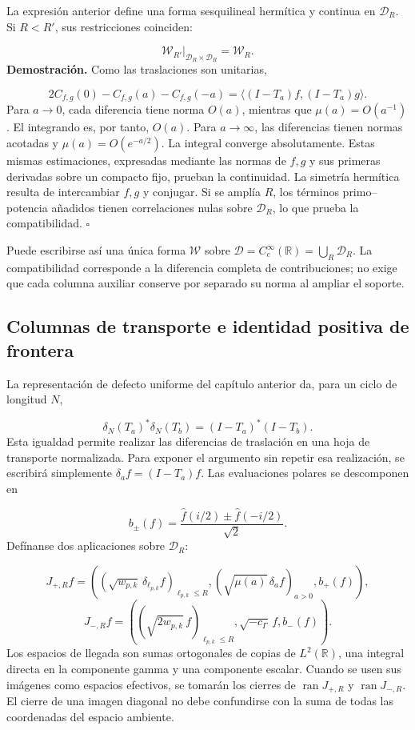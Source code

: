 La expresión anterior define una forma sesquilineal hermítica y continua en \(\mathcal D_R\). Si \(R<R'\), sus restricciones coinciden:

\[
\mathscr W_{R'}|_{\mathcal D_R\times\mathcal D_R}=\mathscr W_R.
\]
\textbf{Demostración.} Como las traslaciones son unitarias,

\[
2C_{f,g}(0)-C_{f,g}(a)-C_{f,g}(-a)
=\langle(I-T_a)f,(I-T_a)g\rangle.
\]
Para \(a\to0\), cada diferencia tiene norma \(O(a)\), mientras que \(\mu(a)=O(a^{-1})\). El integrando es, por tanto, \(O(a)\). Para \(a\to\infty\), las diferencias tienen normas acotadas y \(\mu(a)=O(e^{-a/2})\). La integral converge absolutamente. Estas mismas estimaciones, expresadas mediante las normas de \(f,g\) y sus primeras derivadas sobre un compacto fijo, prueban la continuidad. La simetría hermítica resulta de intercambiar \(f,g\) y conjugar. Si se amplía \(R\), los términos primo–potencia añadidos tienen correlaciones nulas sobre \(\mathcal D_R\), lo que prueba la compatibilidad. \hfill\(\square\)

Puede escribirse así una única forma \(\mathscr W\) sobre \(\mathcal D=C_c^\infty(\mathbb R)=\bigcup_R\mathcal D_R\). La compatibilidad corresponde a la diferencia completa de contribuciones; no exige que cada columna auxiliar conserve por separado su norma al ampliar el soporte.

\subsection{Columnas de transporte e identidad positiva de frontera}
\label{viii:rz:columnas}
La representación de defecto uniforme del capítulo anterior da, para un ciclo de longitud \(N\),

\[
\delta_N(T_a)^*\delta_N(T_b)=(I-T_a)^*(I-T_b).
\]
Esta igualdad permite realizar las diferencias de traslación en una hoja de transporte normalizada. Para exponer el argumento sin repetir esa realización, se escribirá simplemente \(\delta_af=(I-T_a)f\). Las evaluaciones polares se descomponen en

\[
b_\pm(f)=\frac{\widehat f(i/2)\pm\widehat f(-i/2)}{\sqrt2}.
\]
Defínanse dos aplicaciones sobre \(\mathcal D_R\):

\[
J_{+,R}f=
\left(
(\sqrt{w_{p,k}}\,\delta_{\ell_{p,k}}f)_{\ell_{p,k}\leq R},
(\sqrt{\mu(a)}\,\delta_af)_{a>0},
b_+(f)
\right),
\]
\[
J_{-,R}f=
\left(
(\sqrt{2w_{p,k}}\,f)_{\ell_{p,k}\leq R},
\sqrt{-c_\Gamma}\,f,
b_-(f)
\right).
\]
Los espacios de llegada son sumas ortogonales de copias de \(L^2(\mathbb R)\), una integral directa en la componente gamma y una componente escalar. Cuando se usen sus imágenes como espacios efectivos, se tomarán los cierres de \(\operatorname{ran}J_{+,R}\) y \(\operatorname{ran}J_{-,R}\). El cierre de una imagen diagonal no debe confundirse con la suma de todas las coordenadas del espacio ambiente.

